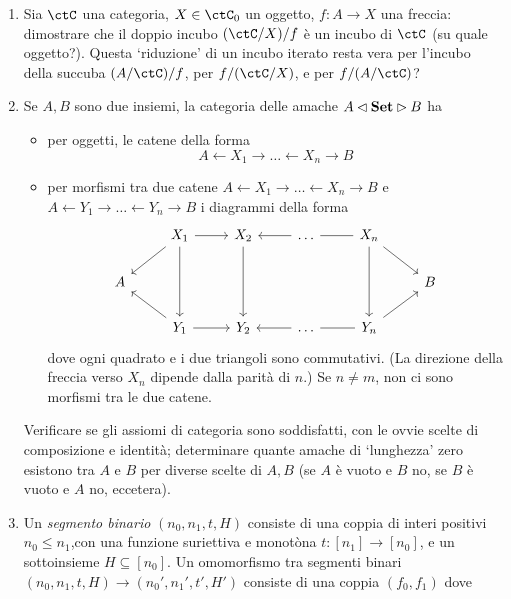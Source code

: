 \begin{enumerate}
	\item Sia $\ctC$ una categoria, $X\in\ctC_0$ un oggetto, $f : A\to X$ una freccia: dimostrare che il doppio incubo $(\ctC/X)/f$ è un incubo di $\ctC$ (su quale oggetto?). Questa `riduzione' di un incubo iterato resta vera per l'incubo della succuba $(A/\ctC)/f$, per $f/(\ctC/X)$, e per $f/(A/\ctC)$?
	\item Se $A,B$ sono due insiemi, la categoria delle amache $A\lhd\mathbf{Set}\rhd B$ ha 
	\begin{itemize}
		\item per oggetti, le catene della forma 
		\[A \leftarrow X_1 \to \dots \leftarrow X_n \to B\]
		\item per morfismi tra due catene $A \leftarrow X_1 \to \dots \leftarrow X_n \to B$ e $A \leftarrow Y_1 \to \dots \leftarrow Y_n \to B$ i diagrammi della forma
\[\begin{tikzcd}
	& {X_1} & {X_2} & \dots & {X_n} \\
	A &&&&& B \\
	& {Y_1} & {Y_2} & \dots & {Y_n}
	\arrow[from=1-2, to=2-1]
	\arrow[from=3-2, to=2-1]
	\arrow[from=1-2, to=1-3]
	\arrow[from=1-5, to=2-6]
	\arrow[from=3-5, to=2-6]
	\arrow[from=1-4, to=1-3]
	\arrow[no head, from=1-4, to=1-5]
	\arrow[from=3-2, to=3-3]
	\arrow[from=3-4, to=3-3]
	\arrow[no head, from=3-4, to=3-5]
	\arrow[from=1-2, to=3-2]
	\arrow[from=1-3, to=3-3]
	\arrow[from=1-5, to=3-5]
\end{tikzcd}\]
dove ogni quadrato e i due triangoli sono commutativi. (La direzione della freccia verso $X_n$ dipende dalla parità di $n$.) Se $n\ne m$, non ci sono morfismi tra le due catene.
\end{itemize}
Verificare se gli assiomi di categoria sono soddisfatti, con le ovvie scelte di composizione e identità; determinare quante amache di `lunghezza' zero esistono tra $A$ e $B$ per diverse scelte di $A,B$ (se $A$ è vuoto e $B$ no, se $B$ è vuoto e $A$ no, eccetera).
	\item Un \emph{segmento binario} $(n_0,n_1,t,H)$ consiste di una coppia di interi positivi $n_0 \le n_1$,con una funzione suriettiva e monotòna $t : [n_1] \to [n_0]$, e un sottoinsieme $H\subseteq [n_0]$. Un omomorfismo tra segmenti binari $(n_0,n_1,t,H) \to (n_0',n_1',t',H')$ consiste di una coppia $(f_0,f_1)$ dove 

\end{enumerate}
